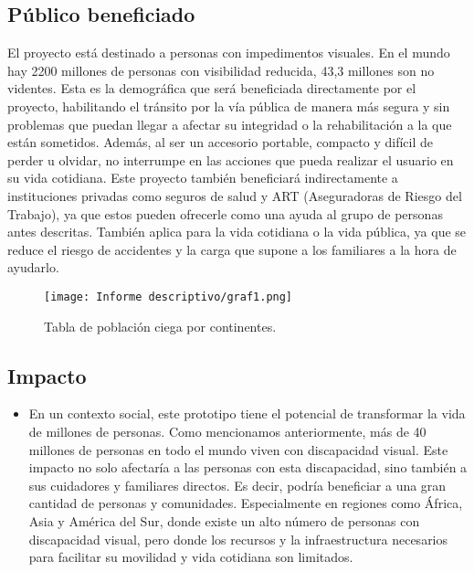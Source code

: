 \documentclass[12pt,a4paper]{article}
\begin{document}
\subsection{Público beneficiado}
El proyecto está destinado a personas con impedimentos visuales. En el mundo hay 2200 millones de personas con visibilidad reducida, 43,3 millones son no videntes. Esta es la demográfica que será beneficiada directamente por el proyecto, habilitando el tránsito por la vía pública de manera más segura y sin problemas que puedan llegar a afectar su integridad o la rehabilitación a la que están sometidos. Además, al ser un accesorio portable, compacto y difícil de perder u olvidar, no interrumpe en las acciones que pueda realizar el usuario en su vida cotidiana. Este proyecto también beneficiará indirectamente a instituciones privadas como seguros de salud y ART (Aseguradoras de Riesgo del Trabajo), ya que estos pueden ofrecerle como una ayuda al grupo de personas antes descritas. También aplica para la vida cotidiana o la vida pública, ya que se reduce el riesgo de accidentes y la carga que supone a los familiares a la hora de ayudarlo.



\begin{figure}[H]
    \centering
    \texttt{[image: Informe descriptivo/graf1.png]}
    \caption{Tabla de población ciega por continentes.}
\end{figure}

\subsection{Impacto}
 \begin{itemize}
 
\item En un contexto social, este prototipo tiene el potencial de transformar la vida de millones de personas. Como mencionamos anteriormente, más de 40 millones de personas en todo el mundo viven con discapacidad visual. Este impacto no solo afectaría a las personas con esta discapacidad, sino también a sus cuidadores y familiares directos. Es decir, podría beneficiar a una gran cantidad de personas y comunidades. Especialmente en regiones como África, Asia y América del Sur, donde existe un alto número de personas con discapacidad visual, pero donde los recursos y la infraestructura necesarios para facilitar su movilidad y vida cotidiana son limitados.

     
 \end{itemize}
\end{document}
